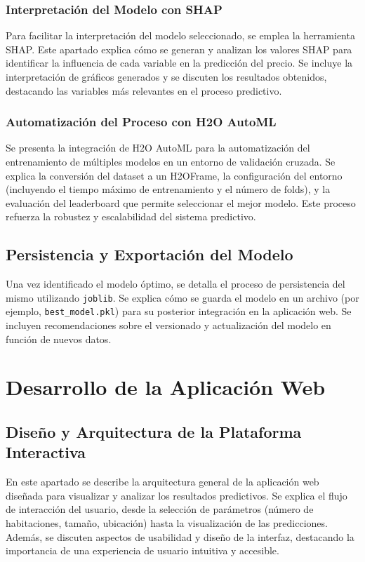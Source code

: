 \documentclass[a4paper,11pt]{book}
\begin{document}
\subsection{Interpretación del Modelo con SHAP}
Para facilitar la interpretación del modelo seleccionado, se emplea la herramienta SHAP. Este apartado explica cómo se generan y analizan los valores SHAP para identificar la influencia de cada variable en la predicción del precio. Se incluye la interpretación de gráficos generados y se discuten los resultados obtenidos, destacando las variables más relevantes en el proceso predictivo.

\subsection{Automatización del Proceso con H2O AutoML}
Se presenta la integración de H2O AutoML para la automatización del entrenamiento de múltiples modelos en un entorno de validación cruzada. Se explica la conversión del dataset a un H2OFrame, la configuración del entorno (incluyendo el tiempo máximo de entrenamiento y el número de folds), y la evaluación del leaderboard que permite seleccionar el mejor modelo. Este proceso refuerza la robustez y escalabilidad del sistema predictivo.

\section{Persistencia y Exportación del Modelo}
Una vez identificado el modelo óptimo, se detalla el proceso de persistencia del mismo utilizando \texttt{joblib}. Se explica cómo se guarda el modelo en un archivo (por ejemplo, \texttt{best\_model.pkl}) para su posterior integración en la aplicación web. Se incluyen recomendaciones sobre el versionado y actualización del modelo en función de nuevos datos.

\chapter{Desarrollo de la Aplicación Web}
\section{Diseño y Arquitectura de la Plataforma Interactiva}
En este apartado se describe la arquitectura general de la aplicación web diseñada para visualizar y analizar los resultados predictivos. Se explica el flujo de interacción del usuario, desde la selección de parámetros (número de habitaciones, tamaño, ubicación) hasta la visualización de las predicciones. Además, se discuten aspectos de usabilidad y diseño de la interfaz, destacando la importancia de una experiencia de usuario intuitiva y accesible.
\end{document}
